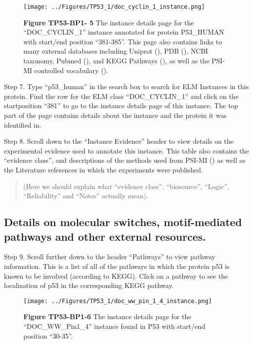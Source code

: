\begin{figure}[h!]
\centering
\texttt{[image: ../Figures/TP53\_1/doc\_cyclin\_1\_instance.png]}
\caption{
\textbf{Figure TP53-BP1- 5} The instance details page for the
``DOC\_CYCLIN\_1'' instance annotated for protein P53\_HUMAN with
start/end position ``381-385''. This page also contains links to many
external databases including Uniprot (\cite{25348405}), PDB
(\cite{12037327}), NCBI taxonomy, Pubmed (\cite{27899561}), and KEGG
Pathways (\cite{26476454}), as well as the PSI-MI controlled vocabulary
(\cite{17925023}).
}
\end{figure}

Step 7. Type ``p53\_human'' in the search box to search for ELM
Instances in this protein. Find the row for the ELM class
``DOC\_CYCLIN\_1'' and click on the startposition ``381'' to go to the
instance details page of this instance. The top part of the page
contains details about the instance and the protein it was identified
in.

Step 8. Scroll down to the ``Instance Evidence'' header to view details
on the experimental evidence used to annotate this instance. This table
also contains the ``evidence class'', and descriptions of the methods
used from PSI-MI (\cite{17925023}) as well as the Literature references
in which the experiments were published.

\begin{quote}
(Here we should explain what ``evidence class'', ``biosource'',
``Logic'', ``Reliability'' and ``Notes'' actually mean).
\end{quote}

\subsection{Details on molecular switches, motif-mediated pathways and
other external
resources.}\label{details-on-molecular-switches-motif-mediated-pathways-and-other-external-resources.}

Step 9. Scroll further down to the header ``Pathways'' to view pathway
information. This is a list of all of the pathways in which the protein
p53 is known to be involved (according to KEGG). Click on a pathway to
see the localization of p53 in the corresponding KEGG pathway.

\begin{figure}[h!]
\centering
\texttt{[image: ../Figures/TP53\_1/doc\_ww\_pin\_1\_4\_instance.png]}
\caption{
\textbf{Figure TP53-BP1-6} The instance details page for the
``DOC\_WW\_Pin1\_4'' instance found in P53 with start/end position
``30-35''.
}
\end{figure}

